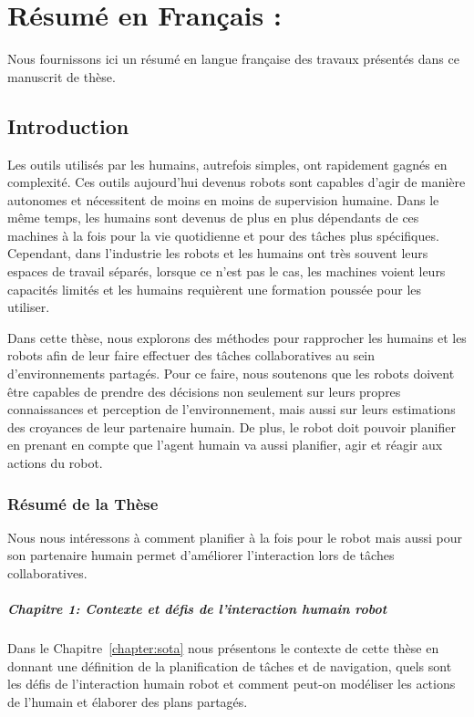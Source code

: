 \chapter{Résumé en Français : }
\label{annex:frenchversion}
Nous fournissons ici un résumé en langue française des travaux présentés dans ce manuscrit de thèse.

\section{Introduction}
Les outils utilisés par les humains, autrefois simples, ont rapidement gagnés en complexité. Ces outils aujourd'hui devenus robots sont capables d'agir de manière autonomes et nécessitent de moins en moins de supervision humaine. Dans le même temps, les humains sont devenus de plus en plus dépendants de ces machines à la fois pour la vie quotidienne et pour des tâches plus spécifiques. Cependant, dans l'industrie les robots et les humains ont très souvent leurs espaces de travail séparés, lorsque ce n'est pas le cas, les machines voient leurs capacités limités et les humains requièrent une formation poussée pour les utiliser.

Dans cette thèse, nous explorons des méthodes pour rapprocher les humains et les robots afin de leur faire effectuer des tâches collaboratives au sein d’environnements partagés. Pour ce faire, nous soutenons que les robots doivent être capables de prendre des décisions non seulement sur leurs propres connaissances et perception de l’environnement, mais aussi sur leurs estimations des croyances de leur partenaire humain. De plus, le robot doit pouvoir planifier en prenant en compte que l'agent humain va aussi planifier, agir et réagir aux actions du robot.

\subsection{Résumé de la Thèse}
Nous nous intéressons à comment planifier à la fois pour le robot mais aussi pour son partenaire humain permet d'améliorer l'interaction lors de tâches collaboratives. 

\paragraph{Chapitre 1: Contexte et défis de l'interaction humain robot}
Dans le Chapitre~\ref{chapter:sota} nous présentons le contexte de cette thèse en donnant une définition de la planification de tâches et de navigation, quels sont les défis de l'interaction humain robot et comment peut-on modéliser les actions de l'humain et élaborer des plans partagés. 

